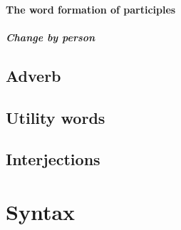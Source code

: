\documentclass[a4paper,12pt]{book}
\newcommand{\1}[1]{\textbf{\emph{#1}}} %
\newcommand{\2}[1]{\textbf{[#1]}} %
\newcommand{\3}[1]{\fontsize{11pt}{0cm}\textbf{\emph{#1}}} %
\newcommand{\4}[1]{\fontsize{10pt}{0cm}\emph{#1}}	%
\newcommand{\5}[1]{\textbf{/#1/}} %
\newcommand{\6}[1]{\textbf{[#1]}} %
\newcommand{\7}[1]{\fontsize{12pt}{0cm}\emph{#1}} %
\newcommand{\8}[1]{\fontsize{12pt}{0cm}`#1'} %
\newcommand{\9}[1]{\fontsize{12pt}{0cm}(lit. `#1')} %
\begin{document}
\subsubsection{The word formation of participles}
\paragraph{Change by person}
\section{Adverb}
\section{Utility words}
\section{Interjections}
\chapter{Syntax}
\end{document}
